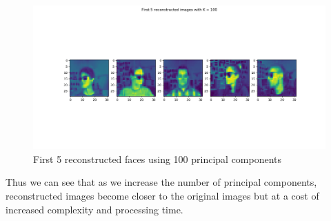 \begin{figure}[h!]
	\centering
	\includegraphics[scale=0.5]{face_pca_100}
	\caption{First 5 reconstructed faces using 100 principal components}
	\label{fig:face_pca_100}
\end{figure}
\newpage
Thus we can see that as we increase the number of principal components, reconstructed images become closer to the original images but at a cost of increased complexity and processing time.